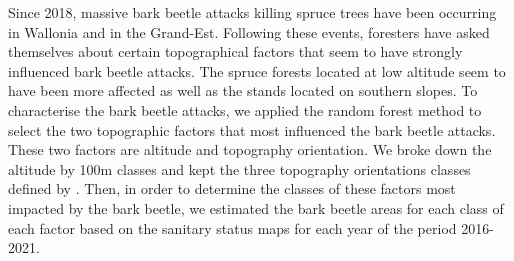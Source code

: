 \documentclass[3p,procedia]{elsarticle}
\begin{document}









Since 2018, massive bark beetle attacks killing spruce trees have been occurring in Wallonia and in the Grand-Est. Following these events, foresters have asked themselves about certain topographical factors that seem to have strongly influenced bark beetle attacks. 
The spruce forests located at low altitude seem to have been more affected as well as the stands located on southern slopes.
To characterise the bark beetle attacks, we applied the random forest method to select the two topographic factors that most influenced the bark beetle attacks.
These two factors are altitude and topography orientation. We broke down the altitude by 100m classes and kept the three topography orientations classes defined by \cite{Delvaux_galoux}.
Then, in order to determine the classes of these factors most impacted by the bark beetle, we estimated the bark beetle areas for each class of each factor based on the sanitary status maps for each year of the period 2016-2021.
\end{document}
